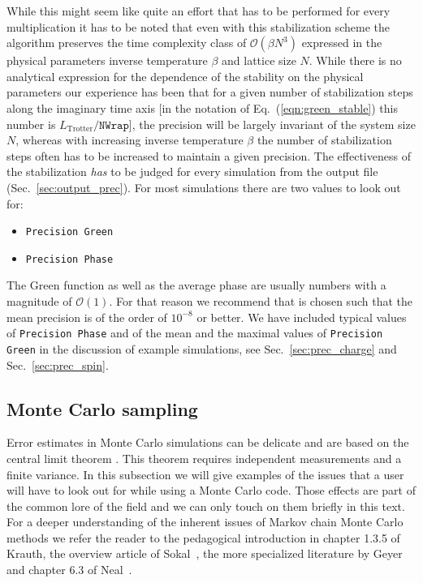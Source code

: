 \documentclass{SciPost}
\begin{document}
While this might seem like quite an effort that has to be performed for every multiplication
it has to be noted that even with this stabilization scheme the algorithm preserves the time complexity class of $\mathcal{O}(\beta N^3)$ expressed in the physical parameters inverse temperature $\beta$ and lattice size $N$.
While there is no analytical expression for the dependence of the stability on the physical parameters
our experience has been that for a given number of stabilization steps along the imaginary time axis [in the notation of Eq.~(\ref{eqn:green_stable}) this number is $L_{\text{Trotter}}/\texttt{NWrap}$], the precision will be largely invariant of the system size $N$,
whereas with increasing inverse temperature $\beta$ the number of stabilization steps often has to be increased to maintain a given precision.
The effectiveness of the stabilization \emph{has} to be judged for every simulation from the output file  (Sec.~\ref{sec:output_prec}). For most simulations there are two values to look out for:
\begin{itemize}
\item \texttt{Precision Green}
\item \texttt{Precision Phase}
\end{itemize}
The Green function as well as the average phase are usually numbers with a magnitude of $\mathcal{O} (1)$. 
For that reason we recommend that  is chosen such that the mean precision is of the order of $10^{-8}$ or better.  
We have included typical values of \texttt{Precision Phase} and of the mean and the maximal values of \texttt{Precision Green} in the 
discussion of example simulations, see Sec.~\ref{sec:prec_charge} and Sec.~\ref{sec:prec_spin}.
%
\subsection{Monte Carlo sampling}\label{sec:sampling}
%
Error estimates  in Monte Carlo simulations  can be  delicate and are based on the central limit theorem \cite{Negele}. This theorem requires independent 
measurements and  a finite variance.
In this subsection we will give examples of the issues that a user will have to look out for while 
using a Monte Carlo code. Those effects are part of the common lore of the field
and we can only touch on them briefly  in this text.
For a deeper understanding of the inherent issues of Markov chain Monte Carlo methods 
we refer the reader to the pedagogical introduction in chapter 1.3.5 of Krauth\cite{Krauth2006}, the overview article of Sokal~\cite{Sokal89},  the more specialized literature by Geyer~\cite{Geyer1992} and chapter 6.3 of Neal~\cite{neal1993}. 
\end{document}
